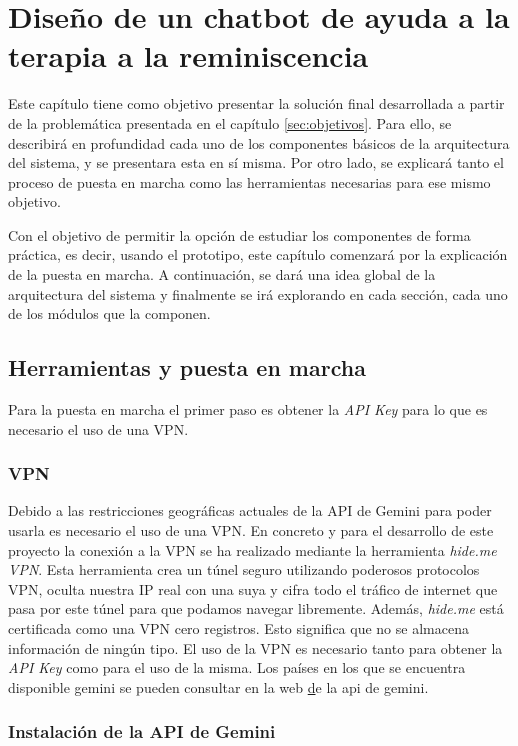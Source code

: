 \chapter{Diseño de un chatbot de ayuda a la terapia a la reminiscencia}
\label{cap:ChatBot final}
Este capítulo tiene como objetivo presentar la solución final desarrollada a partir de la problemática presentada en el capítulo \ref{sec:objetivos}. Para ello, se describirá en profundidad cada uno de los componentes básicos de la arquitectura del sistema, y se presentara esta en sí misma. Por otro lado, se explicará tanto el proceso de puesta en marcha como las herramientas necesarias para ese mismo objetivo. 

Con el objetivo de permitir la opción de estudiar los componentes de forma práctica, es decir, usando el prototipo, este capítulo comenzará por la explicación de la puesta en marcha. A continuación, se dará una idea global de la arquitectura del sistema y finalmente se irá explorando en cada sección, cada uno de los módulos que la componen. 
\section{Herramientas y puesta en marcha}
Para la puesta en marcha el primer paso es obtener la \textit{API Key} para lo que es necesario el uso de una VPN.
\subsection{VPN}
Debido a las restricciones geográficas actuales de la API de Gemini para poder usarla es necesario el uso de una VPN. En concreto y para el desarrollo de este proyecto la conexión a la VPN se ha realizado mediante la herramienta \textit{hide.me VPN}. Esta herramienta crea un túnel seguro utilizando poderosos protocolos VPN, oculta nuestra IP real con una suya y cifra todo el tráfico de internet que pasa por este túnel para que podamos navegar libremente. Además, \textit{hide.me} está certificada como una VPN cero registros. Esto significa que no se almacena información de ningún tipo. El uso de la VPN es necesario tanto para obtener la \textit{API Key} como para el uso de la misma. Los países en los que se encuentra disponible gemini se pueden consultar en la web \href{https://ai.google.dev/gemini-api/docs/available-regions?hl=es-419} de la api de gemini. 

\subsection{Instalación de la API de Gemini}

